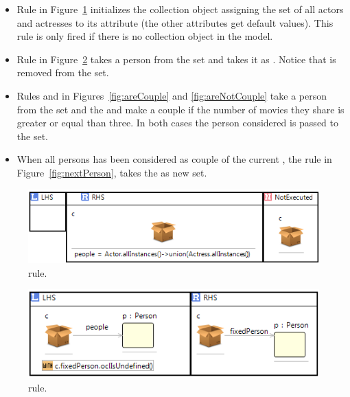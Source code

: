 \begin{itemize}
\item
Rule  in Figure~\ref{fig:initialRule} initializes the collection object assigning the set of all actors and actresses to its  attribute (the other attributes get default values). This rule is only fired if there is no collection object in the model. 
\item
Rule  in Figure~\ref{fig:fixPerson} takes a person from the  set and takes it as . Notice that  is removed from the  set.
\item
Rules  and  in Figures~\ref{fig:areCouple} and \ref{fig:areNotCouple} take a person from the set  and the  and make a couple if the number of movies they share is greater or equal than three. In both cases the person considered is passed to the  set. 
\item
When all persons has been considered as couple of the current , the  rule in Figure~\ref{fig:nextPerson}, takes the  as new  set. 
\end{itemize}


\begin{figure}[htp]
  \centering
  \includegraphics[width=.8\textwidth]{imgs/initialRule}
  \caption{ rule.}\label{fig:initialRule}
\end{figure}

\begin{figure}[htp]
  \centering
  \includegraphics[width=.75\textwidth]{imgs/fixPerson}
  \caption{ rule.}\label{fig:fixPerson}
\end{figure}

